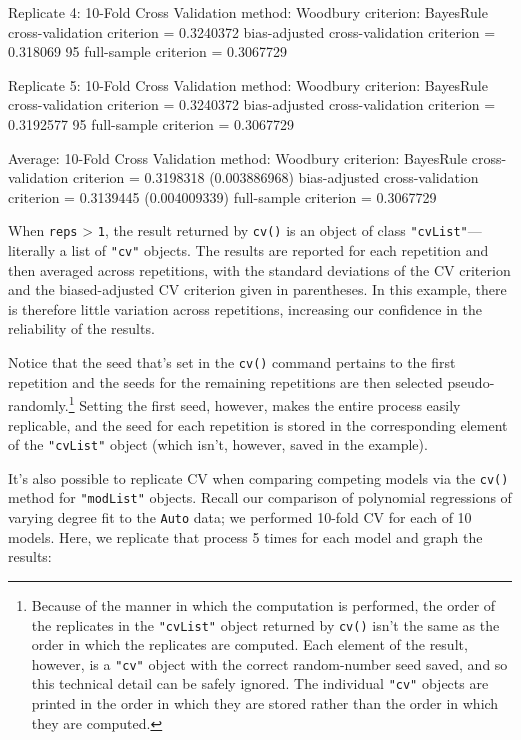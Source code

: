 \documentclass[
]{jss}
\begin{document}
\begin{CodeChunk}
\begin{CodeOutput}
Replicate 4:
10-Fold Cross Validation
method: Woodbury
criterion: BayesRule
cross-validation criterion = 0.3240372
bias-adjusted cross-validation criterion = 0.318069
95%
full-sample criterion = 0.3067729 

Replicate 5:
10-Fold Cross Validation
method: Woodbury
criterion: BayesRule
cross-validation criterion = 0.3240372
bias-adjusted cross-validation criterion = 0.3192577
95%
full-sample criterion = 0.3067729 

Average:
10-Fold Cross Validation
method: Woodbury
criterion: BayesRule
cross-validation criterion = 0.3198318 (0.003886968)
bias-adjusted cross-validation criterion = 0.3139445 (0.004009339)
full-sample criterion = 0.3067729 
\end{CodeOutput}
\end{CodeChunk}

When \texttt{reps} \textgreater{} \texttt{1}, the result returned by
\texttt{cv()} is an object of class \texttt{"cvList"}---literally a list
of \texttt{"cv"} objects. The results are reported for each repetition
and then averaged across repetitions, with the standard deviations of
the CV criterion and the biased-adjusted CV criterion given in
parentheses. In this example, there is therefore little variation across
repetitions, increasing our confidence in the reliability of the
results.

Notice that the seed that's set in the \texttt{cv()} command pertains to
the first repetition and the seeds for the remaining repetitions are
then selected pseudo-randomly.\footnote{Because of the manner in which
  the computation is performed, the order of the replicates in the
  \texttt{"cvList"} object returned by \texttt{cv()} isn't the same as
  the order in which the replicates are computed. Each element of the
  result, however, is a \texttt{"cv"} object with the correct
  random-number seed saved, and so this technical detail can be safely
  ignored. The individual \texttt{"cv"} objects are printed in the order
  in which they are stored rather than the order in which they are
  computed.} Setting the first seed, however, makes the entire process
easily replicable, and the seed for each repetition is stored in the
corresponding element of the \texttt{"cvList"} object (which isn't,
however, saved in the example).

It's also possible to replicate CV when comparing competing models via
the \texttt{cv()} method for \texttt{"modList"} objects. Recall our
comparison of polynomial regressions of varying degree fit to the
\texttt{Auto} data; we performed 10-fold CV for each of 10 models. Here,
we replicate that process 5 times for each model and graph the results:
\end{document}
